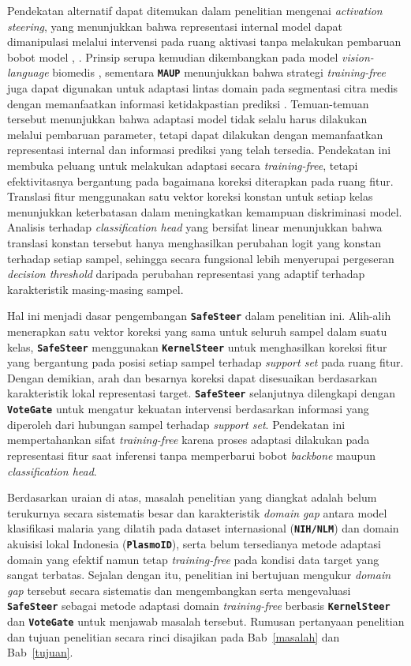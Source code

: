 \documentclass[conference]{IEEEtran}
\newcommand{\nama}[1]{\textbf{\texttt{#1}}}
\begin{document}
Pendekatan alternatif dapat ditemukan dalam penelitian mengenai \textit{activation steering}, yang menunjukkan bahwa representasi internal model dapat dimanipulasi melalui intervensi pada ruang aktivasi tanpa melakukan pembaruan bobot model \cite{b10}, \cite{b11}. Prinsip serupa kemudian dikembangkan pada model \textit{vision-language} biomedis \cite{b12}, sementara \nama{MAUP} menunjukkan bahwa strategi \textit{training-free} juga dapat digunakan untuk adaptasi lintas domain pada segmentasi citra medis dengan memanfaatkan informasi ketidakpastian prediksi \cite{b13}. Temuan-temuan tersebut menunjukkan bahwa adaptasi model tidak selalu harus dilakukan melalui pembaruan parameter, tetapi dapat dilakukan dengan memanfaatkan representasi internal dan informasi prediksi yang telah tersedia. Pendekatan ini membuka peluang untuk melakukan adaptasi secara \textit{training-free}, tetapi efektivitasnya bergantung pada bagaimana koreksi diterapkan pada ruang fitur. Translasi fitur menggunakan satu vektor koreksi konstan untuk setiap kelas menunjukkan keterbatasan dalam meningkatkan kemampuan diskriminasi model. Analisis terhadap \textit{classification head} yang bersifat linear menunjukkan bahwa translasi konstan tersebut hanya menghasilkan perubahan logit yang konstan terhadap setiap sampel, sehingga secara fungsional lebih menyerupai pergeseran \textit{decision threshold} daripada perubahan representasi yang adaptif terhadap karakteristik masing-masing sampel.

Hal ini menjadi dasar pengembangan \nama{SafeSteer} dalam penelitian ini. Alih-alih menerapkan satu vektor koreksi yang sama untuk seluruh sampel dalam suatu kelas, \nama{SafeSteer} menggunakan \nama{KernelSteer} untuk menghasilkan koreksi fitur yang bergantung pada posisi setiap sampel terhadap \textit{support set} pada ruang fitur. Dengan demikian, arah dan besarnya koreksi dapat disesuaikan berdasarkan karakteristik lokal representasi target. \nama{SafeSteer} selanjutnya dilengkapi dengan \nama{VoteGate} untuk mengatur kekuatan intervensi berdasarkan informasi yang diperoleh dari hubungan sampel terhadap \textit{support set}. Pendekatan ini mempertahankan sifat \textit{training-free} karena proses adaptasi dilakukan pada representasi fitur saat inferensi tanpa memperbarui bobot \textit{backbone} maupun \textit{classification head}.

Berdasarkan uraian di atas, masalah penelitian yang diangkat adalah belum terukurnya secara sistematis besar dan karakteristik \textit{domain gap} antara model klasifikasi malaria yang dilatih pada dataset internasional (\nama{NIH/NLM}) dan domain akuisisi lokal Indonesia (\nama{PlasmoID}), serta belum tersedianya metode adaptasi domain yang efektif namun tetap \textit{training-free} pada kondisi data target yang sangat terbatas. Sejalan dengan itu, penelitian ini bertujuan mengukur \textit{domain gap} tersebut secara sistematis dan mengembangkan serta mengevaluasi \nama{SafeSteer} sebagai metode adaptasi domain \textit{training-free} berbasis \nama{KernelSteer} dan \nama{VoteGate} untuk menjawab masalah tersebut. Rumusan pertanyaan penelitian dan tujuan penelitian secara rinci disajikan pada Bab~\ref{masalah} dan Bab~\ref{tujuan}.
\end{document}
